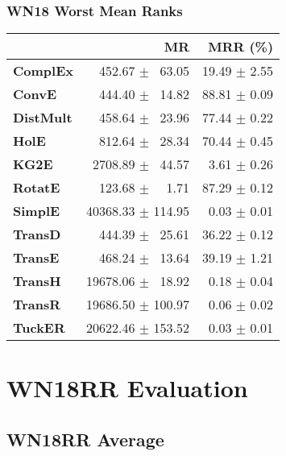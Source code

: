 \documentclass{article}
\begin{document}
\subsubsection{WN18 Worst Mean Ranks}
    \begin{center}
    \begin{tabular}{lrr}
\toprule
{} &                 MR &      MRR (\%) \\
\midrule
\textbf{ComplEx } &  $\phantom{5}$$\phantom{5}$452.67 $\pm$ $\phantom{5}$63.05 &  19.49 $\pm$ 2.55 \\
\textbf{ConvE   } &  $\phantom{5}$$\phantom{5}$444.40 $\pm$ $\phantom{5}$14.82 &  88.81 $\pm$ 0.09 \\
\textbf{DistMult} &  $\phantom{5}$$\phantom{5}$458.64 $\pm$ $\phantom{5}$23.96 &  77.44 $\pm$ 0.22 \\
\textbf{HolE    } &  $\phantom{5}$$\phantom{5}$812.64 $\pm$ $\phantom{5}$28.34 &  70.44 $\pm$ 0.45 \\
\textbf{KG2E    } &  $\phantom{5}$2708.89 $\pm$ $\phantom{5}$44.57 &  $\phantom{5}$3.61 $\pm$ 0.26 \\
\textbf{RotatE  } &  $\phantom{5}$$\phantom{5}$123.68 $\pm$ $\phantom{5}$$\phantom{5}$1.71 &  87.29 $\pm$ 0.12 \\
\textbf{SimplE  } &  40368.33 $\pm$ 114.95 &  $\phantom{5}$0.03 $\pm$ 0.01 \\
\textbf{TransD  } &  $\phantom{5}$$\phantom{5}$444.39 $\pm$ $\phantom{5}$25.61 &  36.22 $\pm$ 0.12 \\
\textbf{TransE  } &  $\phantom{5}$$\phantom{5}$468.24 $\pm$ $\phantom{5}$13.64 &  39.19 $\pm$ 1.21 \\
\textbf{TransH  } &  19678.06 $\pm$ $\phantom{5}$18.92 &  $\phantom{5}$0.18 $\pm$ 0.04 \\
\textbf{TransR  } &  19686.50 $\pm$ 100.97 &  $\phantom{5}$0.06 $\pm$ 0.02 \\
\textbf{TuckER  } &  20622.46 $\pm$ 153.52 &  $\phantom{5}$0.03 $\pm$ 0.01 \\
\bottomrule
\end{tabular}

    \end{center}

\section{WN18RR Evaluation}
\subsection{WN18RR Average}
\end{document}
